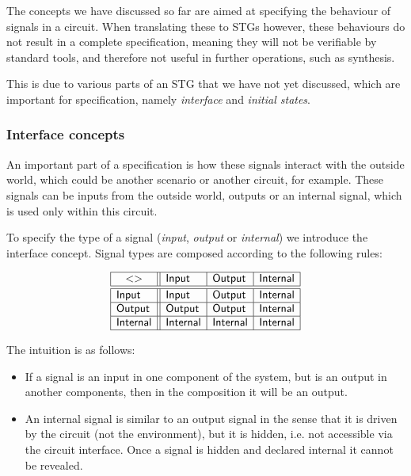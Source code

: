 \documentclass[british,conference,compsoc]{IEEEtran}
\begin{document}
The concepts we have discussed so far are aimed at specifying the behaviour of 
signals in a circuit. When translating these to STGs however, these behaviours 
do not result in a complete specification, meaning they will not be 
verifiable by standard tools, and therefore not useful in further operations, 
such as synthesis.

This is due to various parts of an STG that we have not yet discussed, which 
are important for specification, namely \emph{interface} and 
\emph{initial states}.

\vspace{-3mm}

\subsubsection{Interface concepts\label{sub:interface}} 

An important part of a specification is how these signals interact with the 
outside world, which could be another scenario or another circuit, for example.
These signals can be inputs from the outside world, outputs or an internal 
signal, which is used only within this circuit. 

To specify the type of a signal (\emph{input},
\emph{output} or \emph{internal}) we introduce the \textsf{interface} concept.
Signal types are composed according to the following rules:

\vspace{-2mm}

\[
\begin{array}{|l||l|l|l|}
\hline
\multicolumn{1}{|c||}{<>} & \mathsf{Input} & \mathsf{Output} &
\mathsf{Internal} \\ \hline \hline
\mathsf{Input} & \mathsf{Input} & \mathsf{Output} & \mathsf{Internal} \\ \hline
\mathsf{Output} & \mathsf{Output} & \mathsf{Output} & \mathsf{Internal} \\
\hline
\mathsf{Internal}& \mathsf{Internal} & \mathsf{Internal} & \mathsf{Internal} \\
\hline
\end{array}
\]

The intuition is as follows:
\begin{itemize}
    \item If a signal is an input in one component of the system, but is an
    output in another components, then in the composition it will be an output.
    \item An internal signal is similar to an output signal in the sense
that it is driven by the circuit (not the environment), but it is hidden, 
i.e. not accessible via the circuit interface. Once a signal is hidden and 
declared internal it cannot be revealed.
\end{itemize}
\end{document}

